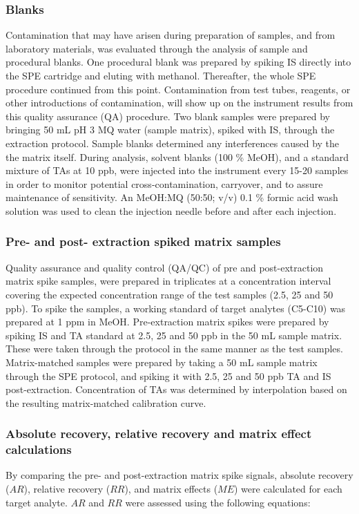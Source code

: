 
\subsubsection{Blanks}
Contamination that may have arisen during preparation of samples, and from laboratory materials, was evaluated through the analysis of sample and procedural blanks. One procedural blank was prepared by spiking IS directly into the SPE cartridge and eluting with methanol. Thereafter, the whole SPE procedure continued from this point. Contamination from test tubes, reagents, or other introductions of contamination, will show up on the instrument results from this quality assurance (QA) procedure. Two blank samples were prepared by bringing 50 mL pH 3 MQ water (sample matrix), spiked with IS, through the extraction protocol. Sample blanks determined any interferences caused by the the matrix itself. During analysis, solvent blanks (100 \% MeOH), and a standard mixture of TAs at 10 ppb, were injected into the instrument every 15-20 samples in order to monitor potential cross-contamination, carryover, and to assure maintenance of sensitivity. An MeOH:MQ (50:50; v/v) 0.1 \% formic acid wash solution was used to clean the injection needle before and after each injection.

\subsubsection{Pre- and post- extraction spiked matrix samples}
Quality assurance and quality control (QA/QC) of pre and post-extraction matrix spike samples, were prepared in triplicates at a concentration interval covering the expected concentration range of the test samples (2.5, 25 and 50 ppb). To spike the samples, a working standard of target analytes (C5-C10) was prepared at 1 ppm in MeOH. Pre-extraction matrix spikes were prepared by spiking IS and \acrshort{TA} standard at 2.5, 25 and 50 ppb in the 50 mL sample matrix. These were taken through the protocol in the same manner as the test samples. Matrix-matched samples were prepared by taking a 50 mL sample matrix through the SPE protocol, and spiking it with 2.5, 25 and 50 ppb TA and IS post-extraction. Concentration of TAs was determined by interpolation based on the resulting matrix-matched calibration curve. 

\subsubsection{Absolute recovery, relative recovery and matrix effect calculations}
By comparing the pre- and post-extraction matrix spike signals, absolute recovery ($AR$), relative recovery ($RR$), and matrix effects ($ME$) were calculated for each target analyte. $AR$ and $RR$ were assessed using the following equations:

